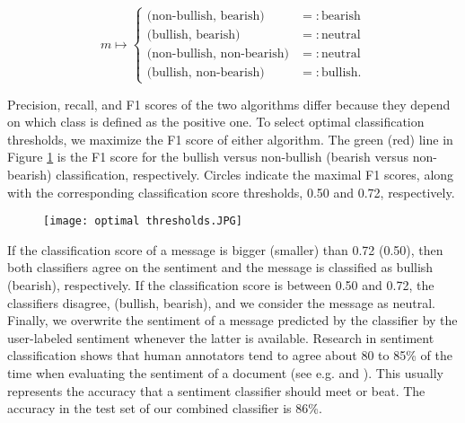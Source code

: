 \[ m\mapsto \begin{cases} \text{(non-bullish, bearish)} & =: \text{bearish} \\ \text{(bullish, bearish)}& =: \text{neutral} \\ \text{(non-bullish, non-bearish)}& =: \text{neutral} \\ \text{(bullish, non-bearish)} &=: \text{bullish.} \end{cases}\] 

Precision, recall, and F1 scores of the two algorithms differ because they depend on which class is defined as the positive one. To select optimal classification thresholds, we maximize the F1 score of either algorithm. The green (red) line in Figure \ref{fig:optimal_thresholds} is the F1 score for the bullish versus non-bullish (bearish versus non-bearish) classification, respectively. Circles indicate the maximal F1 scores, along with the corresponding classification score thresholds, 0.50 and 0.72, respectively. 

\begin{figure}[h]
    \centering
    \texttt{[image: optimal thresholds.JPG]}
    \label{fig:optimal_thresholds}
\end{figure}


If the classification score of a message is bigger (smaller) than 0.72 (0.50), then both classifiers agree on the sentiment and the message is classified as bullish (bearish), respectively. If the classification score is between 0.50 and 0.72, the classifiers disagree, (bullish, bearish), and we consider the message as neutral. Finally, we overwrite the sentiment of a message predicted by the classifier by the user-labeled sentiment whenever the latter is available. Research in sentiment classification shows that human annotators tend to agree about 80 to 85\% of the time when evaluating the sentiment of a document (see e.g. \citet{wilson2005recognizing} and \citet{chen2020large}). This usually represents the accuracy that a sentiment classifier should meet or beat. The accuracy in the test set of our combined classifier is 86\%.


